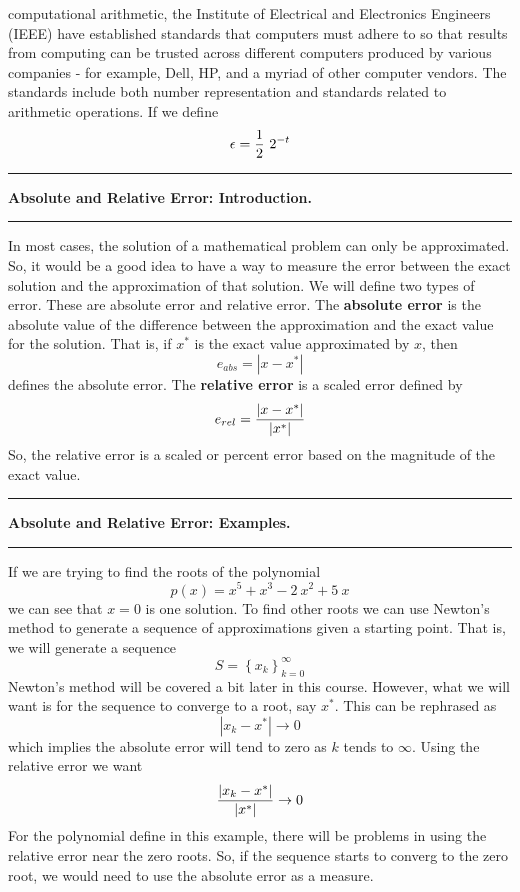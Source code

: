 \documentclass[10pt,fleqn]{article}
\begin{document}
computational arithmetic, the Institute of Electrical and Electronics Engineers
(IEEE) have established standards that computers must adhere to so that results
from computing can be trusted across different computers produced by various
companies - for example, Dell, HP, and a myriad of other computer vendors. The
standards include both number representation and standards related to arithmetic
operations. If we define
\[
  \epsilon = {1\over 2}\ 2^{-t}
\]
\vskip0.1in\hrule\vskip0.1in \noindent
{\bf Absolute and Relative Error: Introduction.} 
\vskip0.1in\hrule\vskip0.1in \noindent
In most cases, the solution of a mathematical problem can only be approximated.
So, it would be a good idea to have a way to measure the error between the exact
solution and the approximation of that solution. We will define two types of
error. These are absolute error and relative error. The {\bf absolute error} is
the absolute value of the difference between the approximation and the exact
value for the solution. That is, if $x^*$ is the exact value approximated by
$x$, then
$$ e_{abs} = | x - x^{*} | $$
defines the absolute error. The {\bf relative error} is a scaled error defined
by
$$ e_{rel} = {{| x - x^{*} |}\over{|x^*|}} $$
So, the relative error is a scaled or percent error based on the magnitude of
the exact value.

\vskip0.1in\hrule\vskip0.1in \noindent
{\bf Absolute and Relative Error: Examples.} 
\vskip0.1in\hrule\vskip0.1in \noindent
If we are trying to find the roots of the polynomial
$$
  p(x) = x^5 + x^3 - 2\ x^2 + 5\ x
$$
we can see that $x=0$ is one solution. To find other roots we can use Newton's
method to generate a sequence of approximations given a starting point. That is,
we will generate a sequence
$$
   S = \left\lbrace x_k \right\rbrace_{k=0}^{\infty}
$$
Newton's method will be covered a bit later in this course. However, what we
will want is for the sequence to converge to a root, say $x^*$. This can be
rephrased as
$$ | x_k - x^* | \rightarrow 0 $$
which implies the absolute error will tend to zero as $k$ tends to $\infty$.
Using the relative error we want
$$ {{ | x_k - x^* | }\over{ | x^* | }} \rightarrow 0 $$
For the polynomial define in this example, there will be problems in using the
relative error near the zero roots. So, if the sequence starts to converg to the
zero root, we would need to use the absolute error as a measure.
\end{document}
